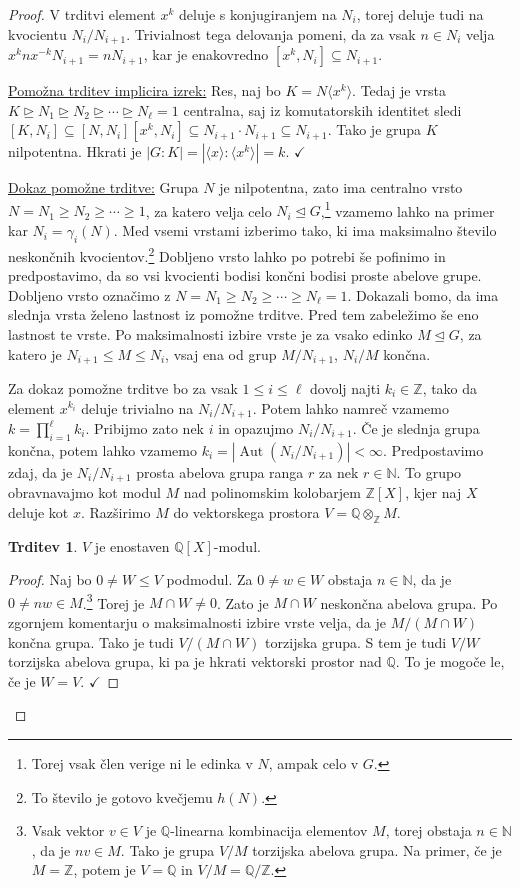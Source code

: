\documentclass[11pt]{book}
\def\NN{\mathbb{N}}
\def\ZZ{\mathbb{Z}}
\def\QQ{\mathbb{Q}}
\DeclareMathOperator\Aut{Aut}
\def\kljuka{$\checkmark$}
\theoremstyle{definition}
\theoremstyle{zgled}
\theoremstyle{odprtproblem}
\theoremstyle{domacanaloga}
\newenvironment{dokaz}
    {\color{siva}\begin{proof}}
    {\end{proof}}
\theoremstyle{izrek}
\newtheorem*{trditev}{Trditev}
\begin{document}
\begin{dokaz}
V trditvi element $x^k$ deluje s konjugiranjem na $N_i$, torej deluje tudi na kvocientu $N_i/N_{i+1}$. Trivialnost tega delovanja pomeni, da za vsak $n \in N_i$ velja $x^k n x^{-k} N_{i+1} = n N_{i+1}$, kar je enakovredno $[x^k, N_i] \subseteq N_{i+1}$.

\underline{Pomožna trditev implicira izrek:} Res, naj bo $K = N\langle x^k \rangle$. Tedaj je vrsta $K \unrhd N_1 \unrhd N_2 \unrhd \cdots \unrhd N_\ell = 1$ centralna, saj iz komutatorskih identitet sledi $[K, N_i] \subseteq [N, N_i][x^k, N_i] \subseteq N_{i+1} \cdot N_{i+1} \subseteq N_{i+1}$. Tako je grupa $K$ nilpotentna. Hkrati je $|G:K| = |\langle x \rangle : \langle x^k \rangle| = k$. \kljuka

\underline{Dokaz pomožne trditve:} Grupa $N$ je nilpotentna, zato ima centralno vrsto $N = N_1 \geq N_2 \geq \cdots \geq 1$, za katero velja celo $N_i \unlhd G$,\footnote{Torej vsak člen verige ni le edinka v $N$, ampak celo v $G$.} vzamemo lahko na primer kar $N_i = \gamma_i(N)$. Med vsemi vrstami izberimo tako, ki ima maksimalno število neskončnih kvocientov.\footnote{To število je gotovo kvečjemu $h(N)$.} Dobljeno vrsto lahko po potrebi še pofinimo in predpostavimo, da so vsi kvocienti bodisi končni bodisi proste abelove grupe. Dobljeno vrsto označimo z $N = N_1 \geq N_2 \geq \cdots \geq N_\ell = 1$. Dokazali bomo, da ima slednja vrsta želeno lastnost iz pomožne trditve. Pred tem zabeležimo še eno lastnost te vrste. Po maksimalnosti izbire vrste je za vsako edinko $M \unlhd G$, za katero je $N_{i+1} \leq M \leq N_i$, vsaj ena od grup $M/N_{i+1}$, $N_i/M$ končna. 

Za dokaz pomožne trditve bo za vsak $1 \leq i \leq \ell$ dovolj najti $k_i \in \ZZ$, tako da element $x^{k_i}$ deluje trivialno na $N_i/N_{i+1}$. Potem lahko namreč vzamemo $k = \prod_{i = 1}^\ell k_i$. Pribijmo zato nek $i$ in opazujmo $N_i/N_{i+1}$. Če je slednja grupa končna, potem lahko vzamemo $k_i = |\Aut(N_i/N_{i+1})| < \infty$. Predpostavimo zdaj, da je $N_i/N_{i+1}$ prosta abelova grupa ranga $r$ za nek $r \in \NN$. To grupo obravnavajmo kot modul $M$ nad polinomskim kolobarjem $\ZZ[X]$, kjer naj $X$ deluje kot $x$. Razširimo $M$ do vektorskega prostora $V = \QQ \otimes_\ZZ M$. 

\begin{trditev}
$V$ je enostaven $\QQ[X]$-modul.
\end{trditev}


\begin{dokaz}
Naj bo $0 \neq W \leq V$ podmodul. Za $0 \neq w \in W$ obstaja $n \in \NN$, da je $0 \neq nw \in M$.\footnote{Vsak vektor $v \in V$ je $\QQ$-linearna kombinacija elementov $M$, torej obstaja $n \in \NN$, da je $nv \in M$. Tako je grupa $V/M$ torzijska abelova grupa. Na primer, če je $M = \ZZ$, potem je $V = \QQ$ in $V/M = \QQ/\ZZ$.} Torej je $M \cap W \neq 0$. Zato je $M \cap W$ neskončna abelova grupa. Po zgornjem komentarju o maksimalnosti izbire vrste velja, da je $M/(M \cap W)$ končna grupa. Tako je tudi $V/(M \cap W)$ torzijska grupa. S tem je tudi $V/W$ torzijska abelova grupa, ki pa je hkrati vektorski prostor nad $\QQ$. To je mogoče le, če je $W = V$. \kljuka
\end{dokaz}


\end{dokaz}
\end{document}
